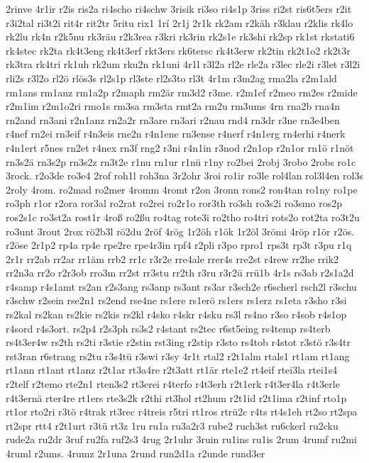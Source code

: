 {2rinve
4r1ir
r2is
ris2a
ri4scho
ri4schw
3risik
ri3so
ri4s1p
3riss
ri2st
ris6t5ers
r2it
r3i2tal
ri3t2i
rit4r
rit2tr
5ritu
rix1
1rí
2r1j
2r1k
rk2am
r2käh
r3klau
r2klis
rk4lo
rk2lu
rk4n
r2k5nu
rk3räu
r2k3rea
r3kri
rk3rin
rk2s1e
rk3shi
rk2sp
rk1st
rkstati6
rk4stec
rk2ta
rk4t3eng
rk4t3erf
rkt3ers
rk6tersc
rk4t3erw
rk2tin
rk2t1o2
rk2t3r
rk3tra
rk4tri
rk1uh
rk2um
rku2n
rk1uni
4r1l
r3l2a
rl2e
rle2a
r3lec
rle2i
r3let
r3l2i
rli2s
r3l2o
rl2ö
rlös3s
rl2s1p
rl3ste
rl2s3to
rl3t
4r1m
r3m2ag
rma2la
r2m1ald
rm1ans
rm1anz
rm1a2p
r2maph
rm2är
rm3d2
r3me.
r2m1ef
r2meo
rm2es
r2mide
r2m1im
r2m1o2ri
rmo1s
rm3sa
rm3sta
rmt2a
rm2u
rm3ums
4rn
rna2b
rna4n
rn2and
rn3ani
r2n1anz
rn2a2r
rn3are
rn3ari
r2nau
rnd4
rn3dr
r3ne
rn3e4ben
r4nef
rn2ei
rn3eif
r4n3eis
rne2n
r4n1ene
rn3ense
r4nerf
r4n1erg
rn4erhi
r4nerk
r4n1ert
r5nes
rn2et
r4nex
rn3f
rng2
r3ni
r4n1in
r3nod
r2n1op
r2n1or
rn1ö
r1nöt
rn3s2ä
rn3s2p
rn3s2z
rn3t2e
r1nu
rn1ur
r1nü
r1ny
ro2bei
2robj
3robo
2robs
ro1c
3rock.
r2o3de
ro3e4
2rof
roh1l
roh3na
3r2ohr
3roi
ro1ir
ro3le
rol4lan
rol3l4en
rol3s
2roly
4rom.
ro2mad
ro2mer
4romm
4romt
r2on
3ronn
rons2
ron4tan
ro1ny
ro1pe
ro3ph
r1or
r2ora
ror3al
ro2rat
ro2rei
ro2r1o
ror3th
ro3sh
ro3s2i
ro3smo
ros2p
ros2s1c
ro3st2a
rost1r
4roß
ro2ßu
ro4tag
rote3i
ro2tho
ro4tri
rots2o
rot2ta
ro3t2u
ro3unt
3rout
2rox
rö2b3l
rö2du
2röf
4rög
1r2öh
r1ök
1r2öl
3römi
4röp
r1ör
r2ös.
r2öse
2r1p2
rp4a
rp4e
rpe2re
rpe4r3in
rpf4
r2pli
r3po
rpro1
rps3t
rp3t
r3pu
r1q
2r1r
rr2ab
rr2ar
rr1äm
rrb2
rr1c
r3r2e
rre4ale
rrer4s
rre2st
r4rew
rr2he
rrik2
rr2n3a
rr2o
r2r3ob
rro3m
rr2st
rr3stu
rr2th
r3ru
r3r2ü
rrü1b
4r1s
rs3ab
r2s1a2d
r4samp
r4s1amt
rs2an
r2s3ang
rs3anp
rs3ant
rs3ar
r3sch2e
r6scherl
rsch2l
r3schu
r3schw
r2sein
rse2n1
rs2end
rse4ne
rs1ere
rs1erö
rs1ers
rs1erz
rs1eta
r3sho
r3si
rs2kal
rs2kan
rs2kie
rs2kis
rs2kl
r4sko
r4skr
r4sku
rs3l
rs4no
r3so
r4sob
r4s1op
r4sord
r4s3ort.
rs2p4
r2s3ph
rs3s2
r4stant
rs2tec
r6st5eing
rs4temp
rs4terb
rs4t3er4w
rs2th
rs2ti
r3stie
r2stin
rst3ing
r2stip
r3sto
rs4tob
r4stot
r3stö
r3s4tr
rst3ran
r6strang
rs2tu
r3s4tü
r3swi
r3sy
4r1t
rtal2
r2t1alm
rtals1
rt1am
rt1ang
rt1ann
rt1ant
rt1anz
r2t1ar
rt3a4re
r2t3att
rt1är
rte1e2
rt4eif
rtei3la
rtei1s4
r2telf
r2temo
rte2n1
rten3s2
rt3erei
r4terfo
r4t3erh
r2t1erk
r4t3er4la
r4t3erle
r4t3ernä
rter4re
rt1ers
rte3s2k
r2thi
rt3hol
rt2hum
r2t1id
r2t1ima
r2tinf
rto1p
rt1or
rto2ri
r3tö
r4trak
rt3rec
r4treis
r5tri
rt1ros
rtrü2c
r4ts
rt4s1eh
rt2so
rt2spa
rt2spr
rtt4
r2t1urt
r3tü
rt3z
1ru
ru1a
ru3a2r3
rube2
ruch3st
ru6ckerl
ru2cku
rude2a
ru2dr
3ruf
ru2fa
ruf2s3
4rug
2r1uhr
3ruin
ru1ins
ru1is
2rum
4rumf
ru2mi
4ruml
r2ums.
4rumz
2r1una
2rund
run2d1a
r2unde
rund3er
}
